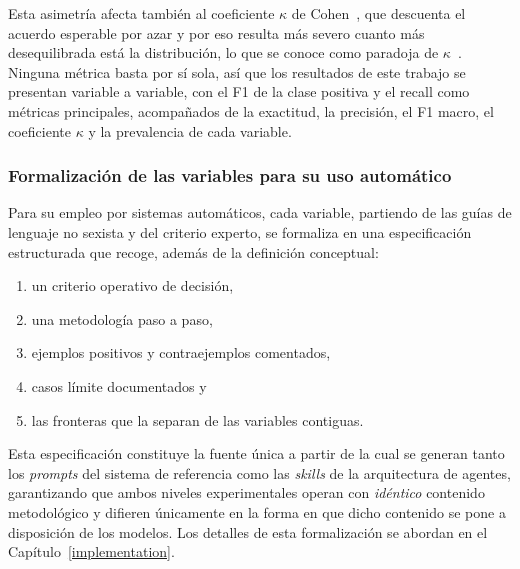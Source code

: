 Esta asimetría afecta también al coeficiente $\kappa$ de Cohen~\cite{cohen1960},
que descuenta el acuerdo esperable por azar y por eso resulta más severo cuanto
más desequilibrada está la distribución, lo que se conoce como paradoja de
$\kappa$~\cite{feinstein1990}. Ninguna métrica basta por sí sola, así que los
resultados de este trabajo se presentan variable a variable, con el F1 de la clase
positiva y el recall como métricas principales, acompañados de la exactitud, la
precisión, el F1 macro, el coeficiente $\kappa$ y la prevalencia de cada variable.

\subsubsection{Formalización de las variables para su uso automático}

Para su empleo por sistemas automáticos, cada variable, partiendo de las guías de
lenguaje no sexista y del criterio experto, se formaliza en una especificación
estructurada que recoge, además de la definición conceptual: 
\begin{enumerate}
    \item un criterio operativo de decisión, 
    \item una metodología paso a paso, 
    \item ejemplos positivos y contraejemplos comentados, 
    \item casos límite documentados y 
    \item las fronteras que la separan de las variables contiguas.
\end{enumerate} 

Esta especificación constituye la fuente
única a partir de la cual se generan tanto los \textit{prompts} del sistema de
referencia como las \textit{skills} de la arquitectura de agentes, garantizando
que ambos niveles experimentales operan con \emph{idéntico} contenido
metodológico y difieren únicamente en la forma en que dicho contenido se pone a
disposición de los modelos. Los detalles de esta formalización se abordan en el
Capítulo~\ref{implementation}.
